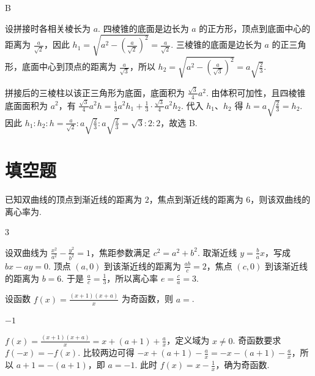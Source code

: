 \begin{answer}
B
\end{answer}

\begin{solution}
设拼接时各相关棱长为 \(a\). 四棱锥的底面是边长为 \(a\) 的正方形，顶点到底面中心的距离为 \(\frac{a}{\sqrt{2}}\)，因此
\(h_1=\sqrt{a^2-(\frac{a}{\sqrt{2}})^2}=\frac{a}{\sqrt{2}}\). 三棱锥的底面是边长为 \(a\) 的正三角形，底面中心到顶点的距离为 \(\frac{a}{\sqrt{3}}\)，所以
\(h_2=\sqrt{a^2-(\frac{a}{\sqrt{3}})^2}=a\sqrt{\frac{2}{3}}\).

拼接后的三棱柱以该正三角形为底面，底面积为 \(\frac{\sqrt{3}}{4}a^2\). 由体积可加性，且四棱锥底面面积为 \(a^2\)，有
\(\frac{\sqrt{3}}{4}a^2h=\frac{1}{3}a^2h_1+\frac{1}{3}\cdot\frac{\sqrt{3}}{4}a^2h_2\). 代入 \(h_1\)、\(h_2\) 得 \(h=a\sqrt{\frac{2}{3}}=h_2\). 因此
\(h_1:h_2:h=\frac{a}{\sqrt{2}}:a\sqrt{\frac{2}{3}}:a\sqrt{\frac{2}{3}}=\sqrt{3}:2:2\)，故选 B.
\end{solution}

\section{填空题}

\begin{problem}
已知双曲线的顶点到渐近线的距离为 \(2\)，焦点到渐近线的距离为 \(6\)，则该双曲线的离心率为\fillinblank{}.
\end{problem}

\begin{answer}
\(3\)
\end{answer}

\begin{solution}
设双曲线为 \(\frac{x^2}{a^2}-\frac{y^2}{b^2}=1\)，焦距参数满足 \(c^2=a^2+b^2\). 取渐近线 \(y=\frac{b}{a}x\)，写成 \(bx-ay=0\). 顶点 \((a,0)\) 到该渐近线的距离为 \(\frac{ab}{c}=2\)，焦点 \((c,0)\) 到该渐近线的距离为 \(b=6\). 于是 \(\frac{a}{c}=\frac{1}{3}\)，所以离心率 \(e=\frac{c}{a}=3\).
\end{solution}

\begin{problem}
设函数 \( f(x) = \frac{(x + 1)(x + a)}{x} \) 为奇函数，则 \( a = \)\fillinblank{}.
\end{problem}

\begin{answer}
\(-1\)
\end{answer}

\begin{solution}
\(f(x)=\frac{(x+1)(x+a)}{x}=x+(a+1)+\frac{a}{x}\)，定义域为 \(x\neq0\). 奇函数要求 \(f(-x)=-f(x)\). 比较两边可得
\(-x+(a+1)-\frac{a}{x}=-x-(a+1)-\frac{a}{x}\)，所以 \(a+1=-(a+1)\)，即 \(a=-1\). 此时 \(f(x)=x-\frac{1}{x}\)，确为奇函数.
\end{solution}


